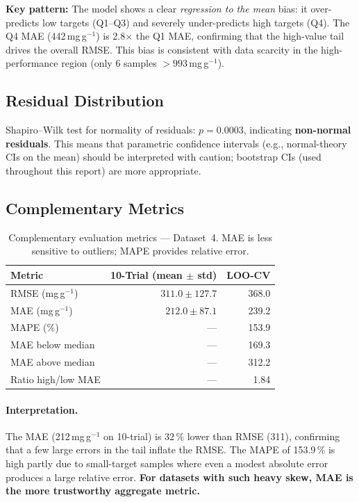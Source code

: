 \documentclass[12pt,a4paper]{article}
\begin{document}
\noindent\textbf{Key pattern:}  The model shows a clear \emph{regression
to the mean} bias: it over-predicts low targets (Q1--Q3) and severely
under-predicts high targets (Q4).  The Q4 MAE (442\,mg\,g$^{-1}$) is
2.8$\times$ the Q1 MAE, confirming that the high-value tail drives the
overall RMSE.  This bias is consistent with data scarcity in the
high-performance region (only 6 samples $> 993$\,mg\,g$^{-1}$).

\subsection{Residual Distribution}

Shapiro--Wilk test for normality of residuals: $p = 0.0003$, indicating
\textbf{non-normal residuals}.  This means that parametric confidence
intervals (e.g., normal-theory CIs on the mean) should be interpreted
with caution; bootstrap CIs (used throughout this report) are more
appropriate.

\subsection{Complementary Metrics}

\begin{table}[h]
\centering
\caption{Complementary evaluation metrics — Dataset~4.  MAE is less
  sensitive to outliers; MAPE provides relative error.}
\label{tab:ds4_complementary}
\small
\begin{tabular}{lrr}
\toprule
Metric & 10-Trial (mean $\pm$ std) & LOO-CV \\
\midrule
RMSE (mg\,g$^{-1}$) & $311.0 \pm 127.7$ & 368.0 \\
MAE  (mg\,g$^{-1}$) & $212.0 \pm 87.1$  & 239.2 \\
MAPE (\%)            & ---               & 153.9 \\
MAE below median     & ---               & 169.3 \\
MAE above median     & ---               & 312.2 \\
Ratio high/low MAE   & ---               & 1.84  \\
\bottomrule
\end{tabular}
\end{table}

\paragraph{Interpretation.}  The MAE (212\,mg\,g$^{-1}$ on 10-trial) is
32\,\% lower than RMSE (311), confirming that a few large errors in the
tail inflate the RMSE.  The MAPE of 153.9\,\% is high partly due to
small-target samples where even a modest absolute error produces a large
relative error.  \textbf{For datasets with such heavy skew, MAE is the
more trustworthy aggregate metric.}
\end{document}
